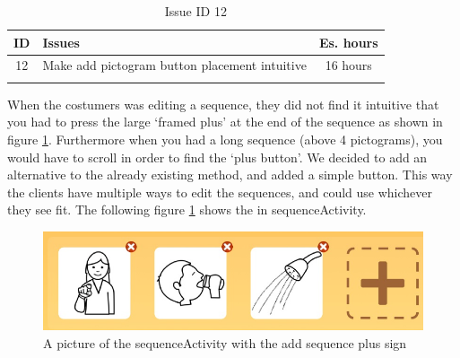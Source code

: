 \begin{longtable} { | c | p{12cm} | c | } 
\hline
	ID 	&	Issues	&		 Es. hours \\\hline
	12 	&	Make add pictogram button placement intuitive	&	16 hours \\\hline
\caption{Issue ID 12}
\label{tab:spr3_addsequencenotintuitive}
\end{longtable}

When the costumers was editing a sequence, they did not find it intuitive that you had to press the large `framed plus' at the end of the sequence as shown in figure \ref{fig:Old_editSequence}. Furthermore when you had a long sequence (above 4 pictograms), you would have to scroll in order to find the `plus button'. We decided to add an alternative to the already existing method, and added a simple button. This way the clients have multiple ways to edit the sequences, and could use whichever they see fit. The following figure \ref{fig:Old_editSequence} shows the  in sequenceActivity.

\begin{figure} [h!]
\centering
\includegraphics[width=.9\textwidth]{Pics/Sprint3/editSequence}
\caption{A picture of the sequenceActivity with the add sequence plus sign}
\label{fig:Old_editSequence}
\end{figure}